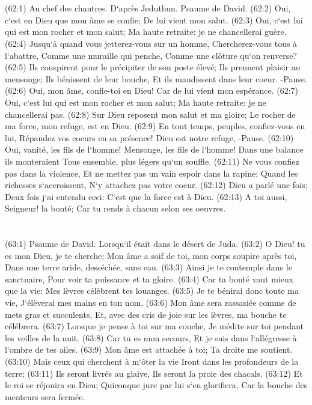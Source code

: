 \chapter{}

\verse (62:1) Au chef des chantres. D`après Jeduthun. Psaume de David. (62:2) Oui, c`est en Dieu que mon âme se confie; De lui vient mon salut. 
\verse (62:3) Oui, c`est lui qui est mon rocher et mon salut; Ma haute retraite: je ne chancellerai guère. 
\verse (62:4) Jusqu`à quand vous jetterez-vous sur un homme, Chercherez-vous tous à l`abattre, Comme une muraille qui penche, Comme une clôture qu`on renverse? 
\verse (62:5) Ils conspirent pour le précipiter de son poste élevé; Ils prennent plaisir au mensonge; Ils bénissent de leur bouche, Et ils maudissent dans leur coeur. -Pause. 
\verse (62:6) Oui, mon âme, confie-toi en Dieu! Car de lui vient mon espérance. 
\verse (62:7) Oui, c`est lui qui est mon rocher et mon salut; Ma haute retraite: je ne chancellerai pas. 
\verse (62:8) Sur Dieu reposent mon salut et ma gloire; Le rocher de ma force, mon refuge, est en Dieu. 
\verse (62:9) En tout temps, peuples, confiez-vous en lui, Répandez vos coeurs en sa présence! Dieu est notre refuge, -Pause. 
\verse (62:10) Oui, vanité, les fils de l`homme! Mensonge, les fils de l`homme! Dans une balance ils monteraient Tous ensemble, plus légers qu`un souffle. 
\verse (62:11) Ne vous confiez pas dans la violence, Et ne mettez pas un vain espoir dans la rapine; Quand les richesses s`accroissent, N`y attachez pas votre coeur. 
\verse (62:12) Dieu a parlé une fois; Deux fois j`ai entendu ceci: C`est que la force est à Dieu. 
\verse (62:13) A toi aussi, Seigneur! la bonté; Car tu rends à chacun selon ses oeuvres. 

\chapter{}

\verse (63:1) Psaume de David. Lorsqu`il était dans le désert de Juda. (63:2) O Dieu! tu es mon Dieu, je te cherche; Mon âme a soif de toi, mon corps soupire après toi, Dans une terre aride, desséchée, sans eau. 
\verse (63:3) Ainsi je te contemple dans le sanctuaire, Pour voir ta puissance et ta gloire. 
\verse (63:4) Car ta bonté vaut mieux que la vie: Mes lèvres célèbrent tes louanges. 
\verse (63:5) Je te bénirai donc toute ma vie, J`élèverai mes mains en ton nom. 
\verse (63:6) Mon âme sera rassasiée comme de mets gras et succulents, Et, avec des cris de joie sur les lèvres, ma bouche te célébrera. 
\verse (63:7) Lorsque je pense à toi sur ma couche, Je médite sur toi pendant les veilles de la nuit. 
\verse (63:8) Car tu es mon secours, Et je suis dans l`allégresse à l`ombre de tes ailes. 
\verse (63:9) Mon âme est attachée à toi; Ta droite me soutient. 
\verse (63:10) Mais ceux qui cherchent à m`ôter la vie Iront dans les profondeurs de la terre; 
\verse (63:11) Ils seront livrés au glaive, Ils seront la proie des chacals. 
\verse (63:12) Et le roi se réjouira en Dieu; Quiconque jure par lui s`en glorifiera, Car la bouche des menteurs sera fermée. 

